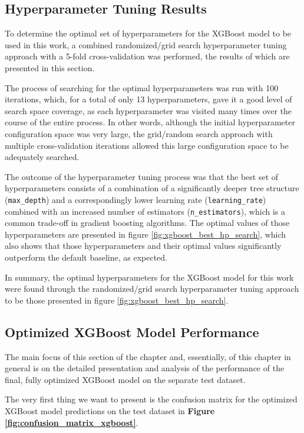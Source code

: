\subsection{Hyperparameter Tuning Results}

To determine the optimal set of hyperparameters for the XGBoost model to be used in this work, a combined randomized/grid search hyperparameter tuning approach with a 5-fold cross-validation was performed, the results of which are presented in this section.

The process of searching for the optimal hyperparameters was run with 100 iterations, which, for a total of only 13 hyperparameters, gave it a good level of search space coverage, as each hyperparameter was visited many times over the course of the entire process. In other words, although the initial hyperparameter configuration space was very large, the grid/random search approach with multiple cross-validation iterations allowed this large configuration space to be adequately searched.

The outcome of the hyperparameter tuning process was that the best set of hyperparameters consists of a combination of a significantly deeper tree structure (\texttt{max\_depth}) and a correspondingly lower learning rate (\texttt{learning\_rate}) combined with an increased number of estimators (\texttt{n\_estimators}), which is a common trade-off in gradient boosting algorithms. The optimal values of those hyperparameters are presented in figure \ref{fig:xgboost_best_hp_search}, which also shows that those hyperparameters and their optimal values significantly outperform the default baseline, as expected.

In summary, the optimal hyperparameters for the XGBoost model for this work were found through the randomized/grid search hyperparameter tuning approach to be those presented in figure \ref{fig:xgboost_best_hp_search}.

\subsection{Optimized XGBoost Model Performance}

The main focus of this section of the chapter and, essentially, of this chapter in general is on the detailed presentation and analysis of the performance of the final, fully optimized XGBoost model on the separate test dataset.

The very first thing we want to present is the confusion matrix for the optimized XGBoost model predictions on the test dataset in \textbf{Figure \ref{fig:confusion_matrix_xgboost}}.

